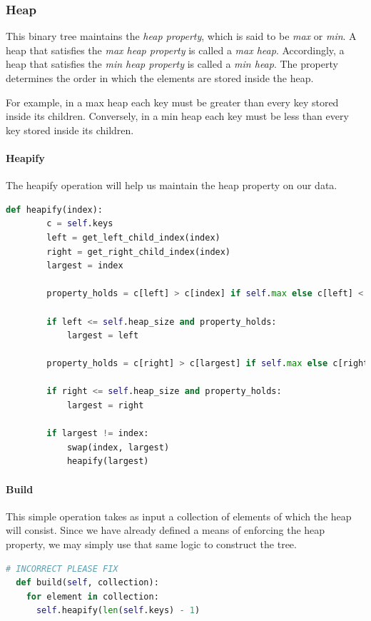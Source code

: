 \documentclass{article}
\begin{document}
\subsubsection{Heap}
This binary tree maintains the {\em heap property}, which is said to be {\em max} or {\em min}.
A heap that satisfies the {\em max heap property} is called a {\em max heap}.
Accordingly, a heap that satisfies the {\em min heap property} is called a {\em min heap}.
The property determines the order in which the elements are stored inside the heap.

For example, in a max heap each key must be greater than every key stored inside its children.
Conversely, in a min heap each key must be less than every key stored inside its children.

\paragraph{Heapify}
The heapify operation will help us maintain the heap property on our data.

\begin{lstlisting}[language=Python]
  def heapify(index):
        c = self.keys
        left = get_left_child_index(index)
        right = get_right_child_index(index)
        largest = index

        property_holds = c[left] > c[index] if self.max else c[left] < c[index]
        
        if left <= self.heap_size and property_holds:
            largest = left

        property_holds = c[right] > c[largest] if self.max else c[right] < c[largest]
        
        if right <= self.heap_size and property_holds:
            largest = right
        
        if largest != index:
            swap(index, largest)
            heapify(largest)
\end{lstlisting}

\paragraph{Build}
This simple operation takes as input a collection of elements of which the heap will consist.
Since we have already defined a means of enforcing the heap property, we may simply use that same logic to construct the tree.

\begin{lstlisting}[language=Python]
  # INCORRECT PLEASE FIX
  def build(self, collection):
    for element in collection:
      self.heapify(len(self.keys) - 1)
\end{lstlisting}
\end{document}
